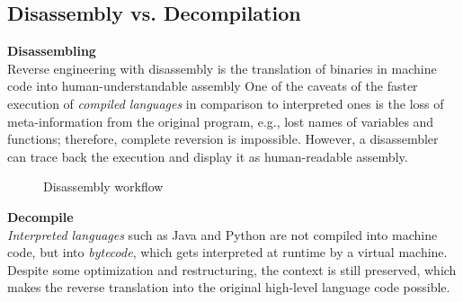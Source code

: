 \documentclass[seminar]{plai}
\begin{document}
\subsection{Disassembly vs. Decompilation}
\label{disassembly-vs-decompilation}

\textbf{Disassembling}\\
Reverse engineering with disassembly is the translation of binaries in machine code into human-understandable assembly
One of the caveats of the faster execution of \textit{compiled languages} in comparison to interpreted ones is the loss of meta-information from the original program, e.g., lost names of variables and functions; therefore, complete reversion is impossible.
However, a disassembler can trace back the execution and display it as human-readable assembly.\cite{reverse-engineering-vs-disassembly}\\

\begin{figure}[htbp]
\centering
{}
\caption{Disassembly workflow\cite{reverse-engineering-vs-disassembly}}
\label{fig:compile-disassemble}
\end{figure}

\noindent\textbf{Decompile}\\
\textit{Interpreted languages} such as Java and Python are not compiled into machine code, but into \textit{bytecode}, which gets interpreted at runtime by a virtual machine. Despite some optimization and restructuring, the context is still preserved, which makes the reverse translation into the original high-level language code possible.\cite{reverse-engineering-vs-disassembly}
\end{document}
